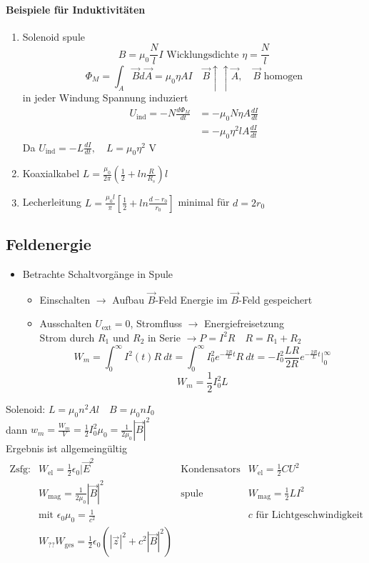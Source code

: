 \documentclass[titlepage,12pt,a4paper,ngerman]{report}
\newcommand{\tx}[1]{\textrm{#1}}
\newcommand{\uind}{U_{\tx{ind}}}
\begin{document}
\paragraph{Beispiele für Induktivitäten}
\begin{enumerate}
	\item Solenoid spule 
	$$B = \mu_0 \frac{N}{l} I \tx{ Wicklungsdichte } \eta = \frac{N}{l}$$
	$$\Phi_M = \int_A \vec{B} d\vec{A} = \mu_0 \eta A I \quad \vec{B}\uparrow \uparrow \vec{A}, \quad \vec{B} \tx{ homogen}$$
	in jeder Windung Spannung induziert
	\begin{align*}
	\uind = - N \frac{d \Phi_M}{dt} &= - \mu_0 N \eta A \frac{dI}{dt}\\
	&=- \mu_0 \eta^2 l A \frac{dI}{dt}
	\end{align*}
	Da $\uind = -L \frac{dI}{dt}, \quad L = \mu_0 \eta^2 \tx{ V}$ 
	\item Koaxialkabel $L = \frac{\mu_0}{2 \pi} ( \frac{1}{2} + ln \frac{R}{R_s}) l$
	\item Lecherleitung $L = \frac{\mu_0 l}{\pi} [\frac{1}{2} + ln \frac{d - r_0}{r_0}]$ minimal für $d= 2r_0$  
\end{enumerate}
\subsection{Feldenergie}
\begin{itemize}
	\item Betrachte Schaltvorgänge in Spule 
	\begin{itemize}
		\item Einschalten $\rightarrow$ Aufbau $\vec{B}$-Feld Energie im $\vec{B}$-Feld gespeichert
		\item Ausschalten $U_{\tx{ext}} = 0$, Stromfluss $\rightarrow$ Energiefreisetzung\\
		Strom durch $R_1$ und $R_2$ in Serie $\rightarrow P = I^2 R \quad R = R_1 + R_2$
		$$W_m = \int_0^\infty I^2 (t) R\ dt = \int_0^\infty I_0^2 e^{-\frac{2R}{L} t} R\ dt = - I_0^2 \frac{LR}{2R}e^{-\frac{2R}{L} t} \bigg|_0^\infty$$
		$$\boxed{W_m = \frac{1}{2}I_0^2 L}$$
	\end{itemize}
\end{itemize}
Solenoid: $L = \mu_0 n^2 Al \quad B = \mu_0 n I_0$\\
dann $w_m = \frac{W_m}{V} = \frac{1}{2} I_0^2 \mu_0 =\frac{1}{2\mu_0}| \vec{B}|^2$\\[5pt]
Ergebnis ist allgemeingültig
$$\begin{array}{llll}
\tx{Zsfg}: & W_{\tx{el}} = \frac{1}{2} \epsilon_0 |\vec{E}^2 & \tx{Kondensators} & W_{\tx{el}} = \frac{1}{2}CU^2 \\
& W_{\tx{mag}} = \frac{1}{2 \mu_0} |\vec{B}|^2 & \tx{spule} & W_{\tx{mag}} = \frac{1}{2}LI^2\\
& \tx{mit } \epsilon_0 \mu_0 = \frac{1}{c^2} && c\tx{ für Lichtgeschwindigkeit} \\
& W_{\tx{??}} W_{\tx{ges}} = \frac{1}{2} \epsilon_0 (|\vec{z}|^2 + c^2 |\vec{B}|^2)
\end{array}$$
\end{document}
